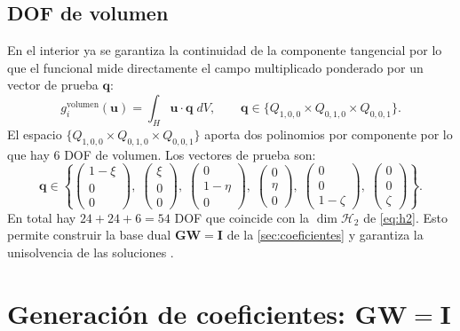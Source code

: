 \documentclass[12pt]{report} %
\begin{document}
\subsection{DOF de volumen}\label{subsec:dof-volumen}
En el interior ya se garantiza la continuidad de la componente tangencial por lo que el  funcional mide directamente el campo multiplicado ponderado por un vector de prueba $\mathbf{q}$:
\begin{equation}\label{eq:dof-volumen}
	g_i^{\text{volumen}}(\mathbf{u}) = \int_{H} \mathbf{u}\cdot \mathbf{q} \; dV,
	\qquad \mathbf{q}\in\{Q_{1,0,0}\times Q_{0,1,0}\times Q_{0,0,1}\}.
\end{equation}
El espacio $\{Q_{1,0,0}\times Q_{0,1,0}\times Q_{0,0,1}\}$ aporta dos polinomios por componente por lo que hay 6 DOF de volumen. Los vectores de prueba son:
\begin{equation*}
	\mathbf{q}\in\left\{
	\begin{pmatrix} 1-\xi \\ 0 \\ 0 \end{pmatrix},\;
	\begin{pmatrix} \xi \\ 0 \\ 0 \end{pmatrix},\;
	\begin{pmatrix} 0 \\ 1-\eta \\ 0 \end{pmatrix},\;
	\begin{pmatrix} 0 \\ \eta \\ 0 \end{pmatrix},\;
	\begin{pmatrix} 0 \\ 0 \\ 1-\zeta \end{pmatrix},\;
	\begin{pmatrix} 0 \\ 0 \\ \zeta \end{pmatrix}
	\right\}.
\end{equation*}
En total hay $24+24+6=54$ DOF que coincide con  la $\dim\mathcal{H}_2$ de \eqref{eq:h2}. Esto permite construir la base dual $\mathbf{G}\mathbf{W}=\mathbf{I}$ de la \autoref{sec:coeficientes} y garantiza la unisolvencia de las soluciones \cite{nedelec1980, amor2023hexahedral, monk2003}.

\section{Generación de coeficientes: $\mathbf{GW}=\mathbf{I}$}\label{sec:coeficientes}
\end{document}
